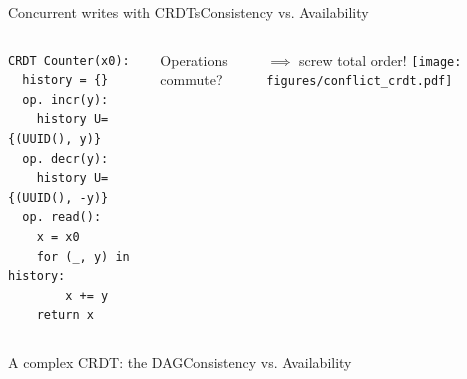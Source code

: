 \begin{frame}[fragile]{Concurrent writes with CRDTs}{Consistency vs. Availability}

\begin{columns}
	\begin{block}{}
		\begin{lstlisting}
CRDT Counter(x0):
  history = {}
  op. incr(y):
    history U= {(UUID(), y)}
  op. decr(y):
    history U= {(UUID(), -y)}
  op. read():
    x = x0
    for (_, y) in history:
    	x += y
    return x
		\end{lstlisting}
	\end{block}
	\vspace{2ex}

	Operations commute?

	$\implies$ screw total order!
	\centering
	\texttt{[image: figures/conflict\_crdt.pdf]}
\end{columns}

\end{frame}


\begin{frame}{A complex CRDT: the DAG}{Consistency vs. Availability}

\centering
{}%

\end{frame}

